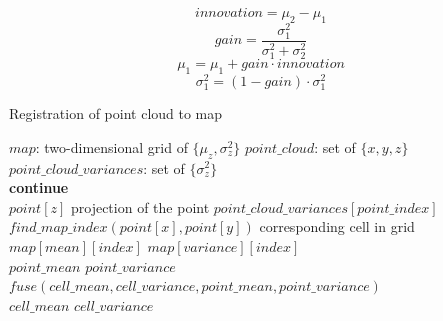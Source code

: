 \begin{itemize}[listparindent=1.5em]
        \begin{equation}
            innovation = \mu_2 - \mu_1
        \end{equation}
        \begin{equation}
            gain = \frac {\sigma^2_1} {\sigma^2_1 + \sigma^2_2}
        \end{equation}
        \begin{equation}
            \mu_1 = \mu_1 + gain \cdot innovation
        \end{equation}
        \begin{equation}
            \sigma^2_1 = \left( 1 - gain \right) \cdot \sigma^2_1
        \end{equation}

        \begin{algorithm}
            \caption{Registration of point cloud to map}
            \label{alg:map_update}
            \begin{algorithmic}[1]
                \State $map$: two-dimensional grid of $\{\mu_z, \sigma^2_z\}$
                \State $point\_cloud$: set of $\{x, y, z\}$
                \State $point\_cloud\_variances$: set of $\{\sigma^2_z\}$ \\

                        \State \textbf{continue}
                    \EndIf \\

                     {$point[z]$}
                    \Comment projection of the point
                     {$point\_cloud\_variances
                        [point\_index]$} \\

                     {$find\_map\_index(point[x], point[y])$}
                    \Comment corresponding cell in grid
                     {$map[mean][index]$}
                     {$map[variance][index]$} \\

                         {$point\_mean$}
                         {$point\_variance$}
                    \Else
                        \State $fuse(cell\_mean, cell\_variance,
                            point\_mean, point\_variance)$ \label{op:fuse}
                    \EndIf \\

                     {$cell\_mean$}
                     {$cell\_variance$}
                \EndFor
            \end{algorithmic}
        \end{algorithm}
\end{itemize}

